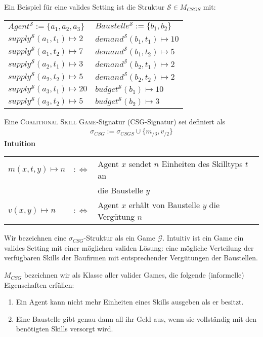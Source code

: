 \begin{bsp}[]
  Ein Beispiel für eine valides Setting ist die Struktur $\mathcal{S}\in M_{CSGS}$ mit:\\

  \setlength{\tabcolsep}{24pt}
  \begin{tabular}{l|l}
    $Agent^\mathcal{S} := \{a_1, a_2, a_3\}$ & $Baustelle^\mathcal{S} := \{b_1, b_2\}$ \\
    $supply^\mathcal{S}(a_1, t_1)\mapsto 2 $ & $demand^\mathcal{S}(b_1, t_1)\mapsto 10$\\
    $supply^\mathcal{S}(a_1, t_2)\mapsto 7 $ & $demand^\mathcal{S}(b_1, t_2)\mapsto 5 $\\
    $supply^\mathcal{S}(a_2, t_1)\mapsto 3 $ & $demand^\mathcal{S}(b_2, t_1)\mapsto 2 $\\
    $supply^\mathcal{S}(a_2, t_2)\mapsto 5 $ & $demand^\mathcal{S}(b_2, t_2)\mapsto 2 $\\
    $supply^\mathcal{S}(a_3, t_1)\mapsto 20$ & $budget^\mathcal{S}(b_1)\mapsto 10$\\
    $supply^\mathcal{S}(a_3, t_2)\mapsto 5 $ & $budget^\mathcal{S}(b_2)\mapsto 3 $\\
  \end{tabular}
\end{bsp}

\begin{definition}[CSG]
  Eine \textsc{Coalitional Skill Game}-Signatur (CSG-Signatur) sei definiert als
  \begin{align*}
    \sigma_{CSG}:=\sigma_{CSGS}\cup\{m_{/3}, v_{/2}\}
  \end{align*}
  \textbf{Intuition} \\
    \begin{tabular}{lrl}
    $m(x, t, y)\mapsto n$&$:\Leftrightarrow$& Agent $x$ sendet $n$ Einheiten des Skilltyps $t$ an \\&&die Baustelle $y$ \\
    $v(x,y)\mapsto n$&$:\Leftrightarrow$& Agent $x$ erhält von Baustelle $y$ die Vergütung $n$
    \end{tabular}
\end{definition}

Wir bezeichnen eine $\sigma_{CSG}$-Struktur als ein Game $\mathcal{G}$. Intuitiv ist ein Game ein valides Setting mit einer möglichen validen Lösung: eine mögliche Verteilung der verfügbaren Skills der Baufirmen mit entsprechender Vergütungen der Baustellen.

$M_{CSG}$ bezeichnen wir als Klasse aller valider Games, die folgende (informelle) Eigenschaften erfüllen:
\begin{enumerate}
  \item Ein Agent kann nicht mehr Einheiten eines Skills ausgeben als er besitzt.
  \item Eine Baustelle gibt genau dann all ihr Geld aus, wenn sie vollständig mit den benötigten Skills versorgt wird.
\end{enumerate}

